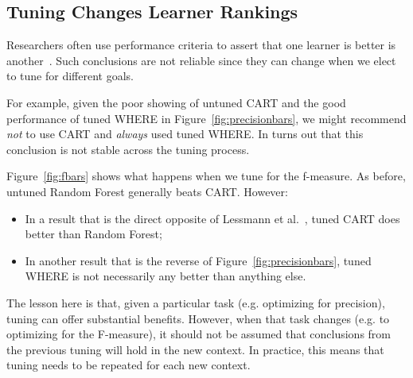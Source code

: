 \documentclass{sig-alternative}
\newcommand{\bi}{\begin{itemize}[leftmargin=0.4cm]}
\newcommand{\ei}{\end{itemize}}
\newcommand{\fig}[1]{Figure~\ref{fig:#1}}
\begin{document}
\subsection{Tuning Changes Learner Rankings}\label{sect:rank}
Researchers often use performance criteria to assert that one learner is better is another~\cite{lessmann2008benchmarking,hall11,me07b}.
Such conclusions are   not reliable since they can change when we elect to tune for different goals. 

For example, given the poor showing of untuned CART and the good performance of tuned WHERE
in   \fig{precisionbars}, we might recommend
{\em not} to use CART and {\em always} used tuned WHERE. In turns out that this
conclusion is not stable across the tuning process.


\fig{fbars} shows what happens when we tune for the f-measure. 
As before, untuned Random Forest generally beats CART. However:
\bi
\item
In  a result that is the direct opposite of   
 Lessmann et al.~\cite{lessmann2008benchmarking}, tuned CART does better than Random Forest;
 \item 
 In another result that is the reverse of \fig{precisionbars}, tuned WHERE is not necessarily
 any better than anything else.
 \ei
The lesson here is that, given a particular task (e.g. optimizing for precision), tuning can offer
substantial benefits. However, when that task changes (e.g. to optimizing for the F-measure),
it should not be assumed that conclusions from the previous tuning will hold in the new context.
In practice, this means that tuning needs to be repeated for each new context.
\end{document}
